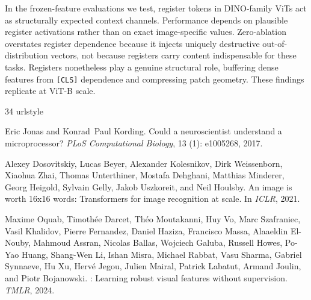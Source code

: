 \documentclass[10pt,twocolumn,letterpaper]{article}
\begin{document}
In the frozen-feature evaluations we test, register tokens in DINO-family ViTs act as structurally expected context channels. Performance depends on plausible register activations rather than on exact image-specific values.
Zero-ablation overstates register dependence because it injects uniquely destructive out-of-distribution vectors, not because registers carry content indispensable for these tasks.
Registers nonetheless play a genuine structural role, buffering dense features from \texttt{[CLS]} dependence and compressing patch geometry.
These findings replicate at ViT-B scale.

{
    \small
    
    \begin{thebibliography}{34}
\providecommand{\natexlab}[1]{#1}
\providecommand{\url}[1]{\texttt{#1}}
\expandafter\ifx\csname urlstyle\endcsname\relax
  \providecommand{\doi}[1]{doi: #1}\else
  \providecommand{\doi}{doi: \begingroup \urlstyle{rm}\Url}\fi

Eric Jonas and Konrad~Paul Kording.
\newblock Could a neuroscientist understand a microprocessor?
\newblock \emph{PLoS Computational Biology}, 13 (1):
  e1005268, 2017.

Alexey Dosovitskiy, Lucas Beyer, Alexander Kolesnikov, Dirk Weissenborn,
  Xiaohua Zhai, Thomas Unterthiner, Mostafa Dehghani, Matthias Minderer, Georg
  Heigold, Sylvain Gelly, Jakob Uszkoreit, and Neil Houlsby.
\newblock An image is worth 16x16 words: Transformers for image recognition at
  scale.
\newblock In \emph{ICLR}, 2021.

Maxime Oquab, Timoth{\'e}e Darcet, Th{\'e}o Moutakanni, Huy Vo, Marc
  Szafraniec, Vasil Khalidov, Pierre Fernandez, Daniel Haziza, Francisco Massa,
  Alaaeldin El-Nouby, Mahmoud Assran, Nicolas Ballas, Wojciech Galuba, Russell
  Howes, Po-Yao Huang, Shang-Wen Li, Ishan Misra, Michael Rabbat, Vasu Sharma,
  Gabriel Synnaeve, Hu Xu, Herv{\'e} Jegou, Julien Mairal, Patrick Labatut,
  Armand Joulin, and Piotr Bojanowski.
: Learning robust visual features without supervision.
\newblock \emph{TMLR}, 2024.


\end{thebibliography}}
\end{document}
